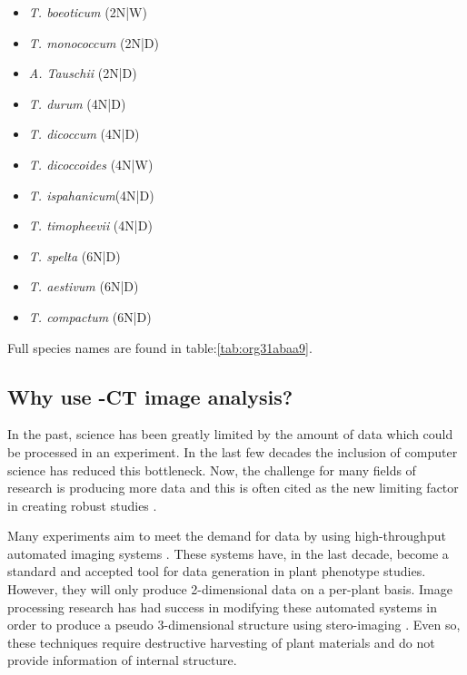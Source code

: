 \documentclass[11pt]{report}
\begin{document}
\begin{multicols}{3}

  \begin{itemize}
  \item{\textit{T. boeoticum} (2N|W)}
  \item{\textit{T. monococcum} (2N|D)}
  \item{\textit{A. Tauschii} (2N|D)}
  \end{itemize}

  \columnbreak

  \begin{itemize}
  \item{\textit{T. durum} (4N|D)}
  \item{\textit{T. dicoccum} (4N|D)}
  \item{\textit{T. dicoccoides} (4N|W)}
  \item{\textit{T. ispahanicum}(4N|D)}
  \item{\textit{T. timopheevii} (4N|D)}
  \end{itemize}

  \columnbreak

  \begin{itemize}
  \item{\textit{T. spelta} (6N|D)}
  \item{\textit{T. aestivum} (6N|D)}
  \item{\textit{T. compactum} (6N|D)}
  \end{itemize}

\end{multicols}
Full species names are found in table:\ref{tab:org31abaa9}.

\subsection{Why use \textmu{}-CT image analysis?}
\label{sec:orgebb3fe6}
In the past, science has been greatly limited by the amount of data which could be processed in an experiment. In the last few decades the inclusion of computer science has reduced this bottleneck. Now, the challenge for many fields of research is producing more data and this is often cited as the new limiting factor in creating robust studies \cite{Furbank2011}.

Many experiments aim to meet the demand for data by using high-throughput automated imaging systems \cite{Naumann2007,Prasanna2013,Humplik2015}. These systems have, in the last decade, become a standard and accepted tool for data generation in plant phenotype studies. However, they will only produce 2-dimensional data on a per-plant basis. Image processing research has had success in modifying these automated systems in order to produce a pseudo 3-dimensional structure using stero-imaging \cite{Roussel2016}. Even so, these techniques require destructive harvesting of plant materials and do not provide information of internal structure.
\end{document}
